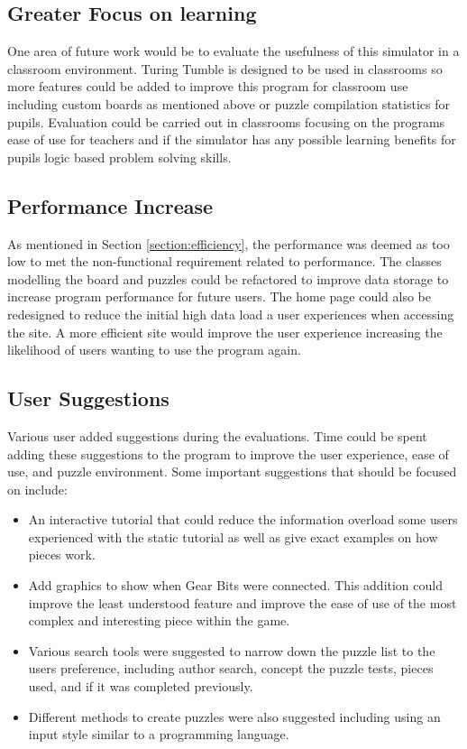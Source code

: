 \documentclass{l4proj}
\begin{document}
\subsection{Greater Focus on learning}
One area of future work would be to evaluate the usefulness of this simulator in a classroom environment. Turing Tumble is designed to be used in classrooms so more features could be added to improve this program for classroom use including custom boards as mentioned above or puzzle compilation statistics for pupils. Evaluation could be carried out in classrooms focusing on the programs ease of use for teachers and if the simulator has any possible learning benefits for pupils logic based problem solving skills. 

\subsection{Performance Increase}
As mentioned in Section \ref{section:efficiency}, the performance was deemed as too low to met the non-functional requirement related to performance. The classes modelling the board and puzzles could be refactored to improve data storage to increase program performance for future users. The home page could also be redesigned to reduce the initial high data load a user experiences when accessing the site. A more efficient site would improve the user experience increasing the likelihood of users wanting to use the program again. 

\subsection{User Suggestions}
Various user added suggestions during the evaluations. Time could be spent adding these suggestions to the program to improve the user experience, ease of use, and puzzle environment. Some important suggestions that should be focused on include: 
\begin{itemize}
    \item An interactive tutorial that could reduce the information overload some users experienced with the static tutorial as well as give exact examples on how pieces work.
    \item Add graphics to show when Gear Bits were connected. This addition could improve the least understood feature and improve the ease of use of the most complex and interesting piece within the game.
    \item Various search tools were suggested to narrow down the puzzle list to the users preference, including author search, concept the puzzle tests, pieces used, and if it was completed previously.
    \item Different methods to create puzzles were also suggested including using an input style similar to a programming language.
\end{itemize}
\end{document}
